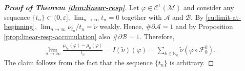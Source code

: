\documentclass{amsart}
\numberwithin{equation}{section}
\newcommand\ve{\varepsilon}
\newcommand\vf{\varphi}
\newcommand\cC{{\mathcal C}}
\newcommand\cF{{\mathcal F}}
\newcommand\cM{{\mathcal M}}
\newcommand\bN{{\mathbb N}}
\begin{document}
\begin{proof}[\textbf{Proof of Theorem \ref{thm:linear-resp}}]
  Let \(\vf \in \cC^1(\cM)\) and consider any sequence \(\{t_n\} \subset (0, \ve]\), \(\lim_{n \to \infty}t_n = 0\) together with \(\mathscr A\) and \(\mathscr B\).
  By \eqref{eq:limit-at-beginning}, \(\lim_{n \to \infty} \nu_{t_n} / t_n = \widetilde \nu\) weakly. Hence, \(\# \partial \mathscr A = 1\) and by Proposition \ref{prop:linear-resp-accumulation} also \(\# \partial \mathscr B = 1\). Therefore,
\[
    \begin{split}
    &\lim_{n \to \infty}\frac{\mu_{t_{n}}(\vf) - \mu_0(\vf)}{t_{n}} = I(\widetilde \nu) (\vf) = \sum_{k \in \bN_0}\widetilde \nu\left(\vf \circ \cF_0^k\right).
    \end{split} 
\]
The claim follows from the fact that the sequence \(\{t_n\}\) is arbitrary.
\end{proof}
\end{document}
